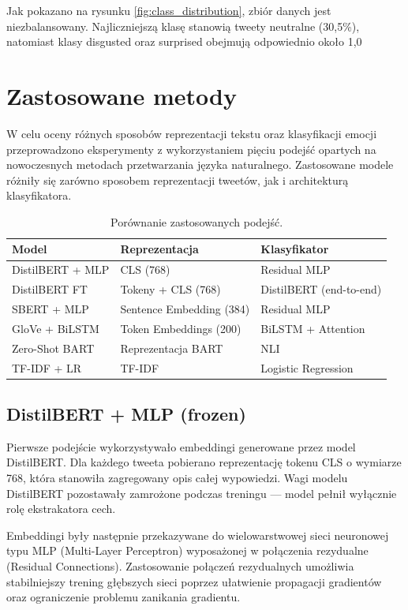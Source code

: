 \documentclass[a4paper,12pt]{article}
\begin{document}
Jak pokazano na rysunku \ref{fig:class_distribution}, zbiór danych jest niezbalansowany. Najliczniejszą klasę stanowią tweety neutralne (30,5\%), natomiast klasy disgusted oraz surprised obejmują odpowiednio około 1,0%

\section{Zastosowane metody}

W celu oceny różnych sposobów reprezentacji tekstu oraz klasyfikacji emocji przeprowadzono eksperymenty z wykorzystaniem pięciu podejść opartych na nowoczesnych metodach przetwarzania języka naturalnego. Zastosowane modele różniły się zarówno sposobem reprezentacji tweetów, jak i architekturą klasyfikatora.

\begin{table}[H]
\centering
\caption{Porównanie zastosowanych podejść.}
\label{tab:models}
\begin{tabular}{lll}
\toprule
Model & Reprezentacja & Klasyfikator \\
\midrule
DistilBERT + MLP & CLS (768) & Residual MLP \\
DistilBERT FT & Tokeny + CLS (768) & DistilBERT (end-to-end) \\
SBERT + MLP & Sentence Embedding (384) & Residual MLP \\
GloVe + BiLSTM & Token Embeddings (200) & BiLSTM + Attention \\
Zero-Shot BART & Reprezentacja BART & NLI \\
TF-IDF + LR & TF-IDF & Logistic Regression \\
\bottomrule
\end{tabular}
\end{table}
\subsection{DistilBERT + MLP (frozen)}

Pierwsze podejście wykorzystywało embeddingi generowane przez model DistilBERT. Dla każdego tweeta pobierano reprezentację tokenu CLS o wymiarze 768, która stanowiła zagregowany opis całej wypowiedzi. Wagi modelu DistilBERT pozostawały zamrożone podczas treningu — model pełnił wyłącznie rolę ekstrakatora cech.

Embeddingi były następnie przekazywane do wielowarstwowej sieci neuronowej typu MLP (Multi-Layer Perceptron) wyposażonej w połączenia rezydualne (Residual Connections). Zastosowanie połączeń rezydualnych umożliwia stabilniejszy trening głębszych sieci poprzez ułatwienie propagacji gradientów oraz ograniczenie problemu zanikania gradientu.
\end{document}
